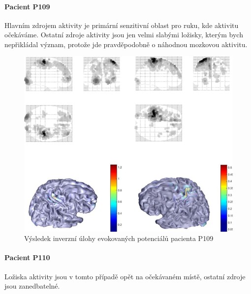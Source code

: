\paragraph{Pacient P109}
Hlavním zdrojem aktivity je primární senzitivní oblast pro ruku, kde aktivitu očekáváme. Ostatní zdroje aktivity jsou jen velmi slabými ložisky, kterým bych nepřikládal význam, protože jde pravděpodobně o náhodnou mozkovou aktivitu.

\begin{figure}[!h]
\includegraphics[width=1.0\textwidth]{casti/aplikace/sep/P109.png}
\caption{Výsledek inverzní úlohy evokovaných potenciálů pacienta P109}
\end{figure}

\paragraph{Pacient P110}
Ložiska aktivity jsou v tomto případě opět na očekávaném místě, ostatní zdroje jsou zanedbatelné.

